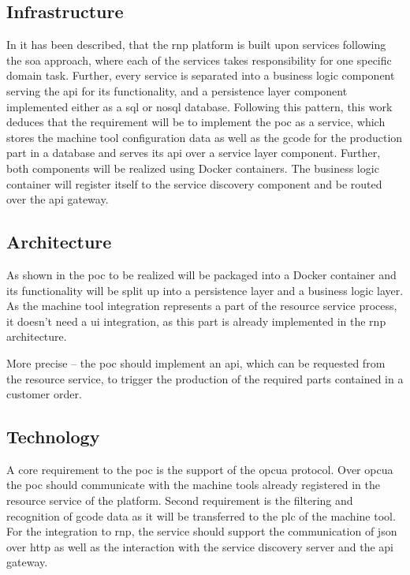 \documentclass[
a4paper,
twoside,
headsepline,
cleardoublepage=empty,
parskip=half,
draft=false
]{scrbook}
\begin{document}
			\subsection{Infrastructure} \label{subsec:infrastructure}

				In  it has been described, that the \gls{rnp} platform is built upon services following the \gls{soa} approach, where each of the services takes responsibility for one specific domain task.
				Further, every service is separated into a business logic component serving the \gls{api} for its functionality, and a persistence layer component implemented either as a \gls{sql} or \gls{nosql} database.
				Following this pattern, this work deduces that the requirement will be to implement the \gls{poc} as a service, which stores the machine tool configuration data as well as the \gls{gcode} for the production part in a database and serves its \gls{api} over a service layer component.
				Further, both components will be realized using Docker containers.
				The business logic container will register itself to the service discovery component and be routed over the \gls{api} gateway.

			\subsection{Architecture} \label{subsec:architecture}

				As shown in  the \gls{poc} to be realized will be packaged into a Docker container and its functionality will be split up into a persistence layer and a business logic layer.
				As the machine tool integration represents a part of the resource service process, it doesn't need a \gls{ui} integration, as this part is already implemented in the \gls{rnp} architecture.

				More precise -- the \gls{poc} should implement an \gls{api}, which can be requested from the resource service, to trigger the production of the required parts contained in a customer order.

			\subsection{Technology} \label{subsec:technology}

				A core requirement to the \gls{poc} is the support of the \gls{opcua} protocol.
				Over \gls{opcua} the \gls{poc} should communicate with the machine tools already registered in the resource service of the platform.
				Second requirement is the filtering and recognition of \gls{gcode} data as it will be transferred to the \gls{plc} of the machine tool.
				For the integration to \gls{rnp}, the service should support the communication of \gls{json} over \gls{http} as well as the interaction with the service discovery server and the \gls{api} gateway.
\end{document}
